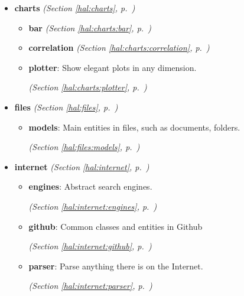\begin{itemize}
\setlength{\parskip}{0ex}
\item \textbf{charts}
  \textit{(Section \ref{hal:charts}, p.~\pageref{hal:charts})}

  \begin{itemize}
\setlength{\parskip}{0ex}
    \item \textbf{bar}
  \textit{(Section \ref{hal:charts:bar}, p.~\pageref{hal:charts:bar})}

    \item \textbf{correlation}
  \textit{(Section \ref{hal:charts:correlation}, p.~\pageref{hal:charts:correlation})}

    \item \textbf{plotter}: Show elegant plots in any dimension. 


  \textit{(Section \ref{hal:charts:plotter}, p.~\pageref{hal:charts:plotter})}

  \end{itemize}
\item \textbf{files}
  \textit{(Section \ref{hal:files}, p.~\pageref{hal:files})}

  \begin{itemize}
\setlength{\parskip}{0ex}
    \item \textbf{models}: Main entities in files, such as documents, folders. 


  \textit{(Section \ref{hal:files:models}, p.~\pageref{hal:files:models})}

  \end{itemize}
\item \textbf{internet}
  \textit{(Section \ref{hal:internet}, p.~\pageref{hal:internet})}

  \begin{itemize}
\setlength{\parskip}{0ex}
    \item \textbf{engines}: Abstract search engines. 


  \textit{(Section \ref{hal:internet:engines}, p.~\pageref{hal:internet:engines})}

    \item \textbf{github}: Common classes and entities in Github 


  \textit{(Section \ref{hal:internet:github}, p.~\pageref{hal:internet:github})}

    \item \textbf{parser}: Parse anything there is on the Internet. 


  \textit{(Section \ref{hal:internet:parser}, p.~\pageref{hal:internet:parser})}


\end{itemize}
\end{itemize}
